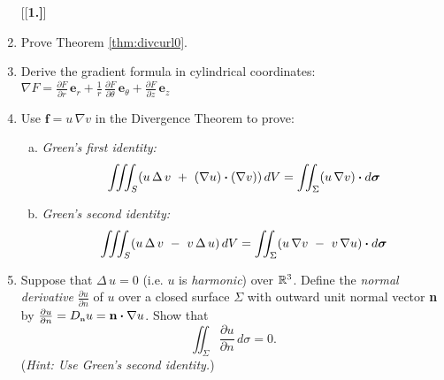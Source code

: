 \begin{enumerate}[\bfseries 1.]
[{[\bfseries 1.]}]
 \item Prove Theorem \ref{thm:divcurl0}.
 \item Derive the gradient formula in cylindrical coordinates: $\nabla F =
  \frac{\partial F}{\partial r}\,\textbf{e}_{r} +
  \frac{1}{r}\,\frac{\partial F}{\partial \theta}\,\textbf{e}_{\theta}+\frac{\partial F}{\partial z}\,\textbf{e}_{z}$
 \item Use $\textbf{f} = u\,\nabla v$ in the Divergence Theorem to prove:
  \begin{enumerate}[(a)]
   \item \emph{Green's first identity:}
    \[\iiint_{S} (u\,\Delta\,v ~+~ (\nabla u) \bm{\cdot} (\nabla v))\,dV =
    \iint_{\Sigma} (u\,\nabla v) \bm{\cdot} d\bm{\sigma}\]
   \item \emph{Green's second identity:}
    \[\iiint_{S} (u\,\Delta\,v ~-~ v\,\Delta\,u)\,dV =
    \iint_{\Sigma} (u\,\nabla v ~-~ v\,\nabla u) \bm{\cdot} d\bm{\sigma}\]
  \end{enumerate}
 \item Suppose that $\Delta\,u = 0$ (i.e. $u$ is \emph{harmonic}) over $\mathbb{R}^{3}$. Define the
  \emph{normal derivative} $\frac{\partial u}{\partial n}$ of $u$ over a closed surface
  $\Sigma$ with outward unit normal vector \textbf{n} by $\frac{\partial u}{\partial n} = D_{\scriptscriptstyle \textbf{n}}u =
  \textbf{n} \bm{\cdot} \nabla u$. 
  Show that 
  \[\iint_{\Sigma} \frac{\partial u}{\partial n} \,d\sigma = 0.\]
  (\emph{Hint: Use Green's second identity.})
\end{enumerate}
